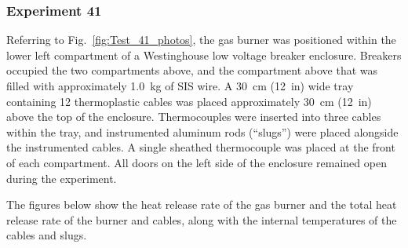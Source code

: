 \documentclass[12pt]{article}
\begin{document}
\subsubsection{Experiment 41}

Referring to Fig.~\ref{fig:Test_41_photos}, the gas burner was positioned within the lower left compartment of a Westinghouse low voltage breaker enclosure. Breakers occupied the two compartments above, and the compartment above that was filled with approximately 1.0~kg of SIS wire. A 30~cm (12~in) wide tray containing 12 thermoplastic cables was placed approximately 30~cm (12~in) above the top of the enclosure. Thermocouples were inserted into three cables within the tray, and instrumented aluminum rods (``slugs'') were placed alongside the instrumented cables. A single sheathed thermocouple was placed at the front of each compartment. All doors on the left side of the enclosure remained open during the experiment.

The figures below show the heat release rate of the gas burner and the total heat release rate of the burner and cables, along with the internal temperatures of the cables and slugs.
\end{document}
